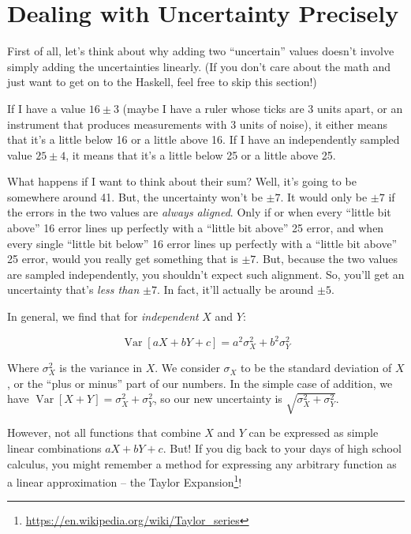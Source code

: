 \documentclass[]{article}
\renewcommand{\href}[2]{#2\footnote{\url{#1}}}
\begin{document}
\section{Dealing with Uncertainty
Precisely}\label{dealing-with-uncertainty-precisely}

First of all, let's think about why adding two ``uncertain'' values
doesn't involve simply adding the uncertainties linearly. (If you don't
care about the math and just want to get on to the Haskell, feel free to
skip this section!)

If I have a value \(16 \pm 3\) (maybe I have a ruler whose ticks are 3
units apart, or an instrument that produces measurements with 3 units of
noise), it either means that it's a little below 16 or a little above
16. If I have an independently sampled value \(25 \pm 4\), it means that
it's a little below 25 or a little above 25.

What happens if I want to think about their sum? Well, it's going to be
somewhere around 41. But, the uncertainty won't be \(\pm 7\). It would
only be \(\pm 7\) if the errors in the two values are \emph{always
aligned}. Only if or when every ``little bit above'' 16 error lines up
perfectly with a ``little bit above'' 25 error, and when every single
``little bit below'' 16 error lines up perfectly with a ``little bit
above'' 25 error, would you really get something that is \(\pm 7\). But,
because the two values are sampled independently, you shouldn't expect
such alignment. So, you'll get an uncertainty that's \emph{less than}
\(\pm 7\). In fact, it'll actually be around \(\pm 5\).

In general, we find that for \emph{independent} \(X\) and \(Y\):

\[
\operatorname{Var}[aX + bY + c] = a^2 \sigma_X^2 + b^2 \sigma_Y^2
\]

Where \(\sigma_X^2\) is the variance in \(X\). We consider \(\sigma_X\)
to be the standard deviation of \(X\), or the ``plus or minus'' part of
our numbers. In the simple case of addition, we have
\(\operatorname{Var}[X + Y] = \sigma_X^2 + \sigma_Y^2\), so our new
uncertainty is \(\sqrt{\sigma_X^2 + \sigma_Y^2}\).

However, not all functions that combine \(X\) and \(Y\) can be expressed
as simple linear combinations \(aX + bY + c\). But! If you dig back to
your days of high school calculus, you might remember a method for
expressing any arbitrary function as a linear approximation -- the
\href{https://en.wikipedia.org/wiki/Taylor_series}{Taylor Expansion}!
\end{document}
